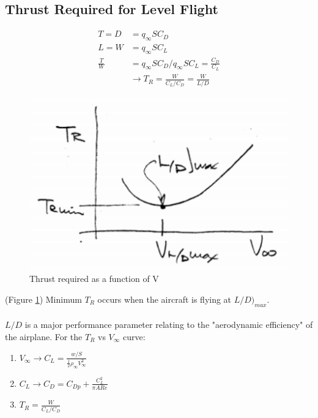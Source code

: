 \documentclass[draft=false, titlepage]{article}
\begin{document}
\subsection{Thrust Required for Level Flight}
\begin{align*}
T = D &= q_\infty S C_D\\
L = W &= q_\infty S C_L\\
\frac{T}{W} &= q_\infty S C_D/q_\infty S C_L = \frac{C_D}{C_L}\\
&\rightarrow \boxed{T_R = \frac{W}{C_L/C_D} = \frac{W}{L/D}}
\end{align*}

\begin{figure}[ht]
	\centering
	\includegraphics[width=0.4\linewidth]{Figures/p67_LDMax.PNG}
	\caption{Thrust required as a function of V}
	\label{fig:p67_LDMax}
\end{figure}

(Figure \ref{fig:p67_LDMax}) Minimum $T_R$ occurs when the aircraft is flying at $L/D\big)_{max}$.
\paragraph*{}$L/D$ is a major performance parameter relating to the "aerodynamic efficiency" of the airplane. For the $T_R$ vs $V_\infty$ curve:
\begin{enumerate}
	\item $V_\infty \rightarrow C_L = \frac{w/S}{\frac{1}{2}\rho_\infty V_\infty^2}$
	\item $C_L \rightarrow C_D = C_{Dp} + \frac{C_L^2}{\pi AR e}$
	\item $T_R = \frac{W}{C_L/C_D}$
\end{enumerate}
\end{document}
